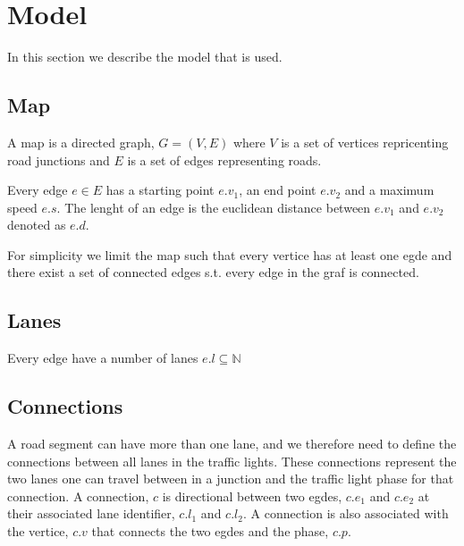 \section{Model}
In this section we describe the model that is used.

\begin{comment}\\\\
\noindent\begin{tabular}{ll}
$\Sigma$ & alphabet\\
$\mathbb{R}$ & set of real numbers\\
$\mathbb{N}$ & set of natual numbers not including zero\\
$\mathbb{N}_0$ & set of natual numbers including zero
\end{tabular}
\end{comment}

\subsection{Map}
A map is a directed graph, $G = (V, E)$ where $V$ is a set of vertices repricenting road junctions and $E$ is a set of edges representing roads.

Every edge $e\in E$ has a starting point $e.v_1$, an end point $e.v_2$ and a maximum speed $e.s$. The lenght of an edge is the euclidean distance between $e.v_1$ and $e.v_2$ denoted as $e.d$.

For simplicity we limit the map such that every vertice has at least one egde and there exist a set of connected edges s.t. every edge in the graf is connected.

\subsection{Lanes}
Every edge have a number of lanes $e.l \subseteq \mathbb{N} $



\subsection{Connections}
A road segment can have more than one lane, and we therefore need to define the connections between all lanes in the traffic lights.
These connections represent the two lanes one can travel between in a junction and the traffic light phase for that connection.
A connection, $c$ is directional between two egdes, $c.e_1$ and $c.e_2$ at their associated lane identifier, $c.l_1$ and $c.l_2$. A connection is also associated with the vertice, $c.v$ that connects the two egdes and the phase, $c.p$.



